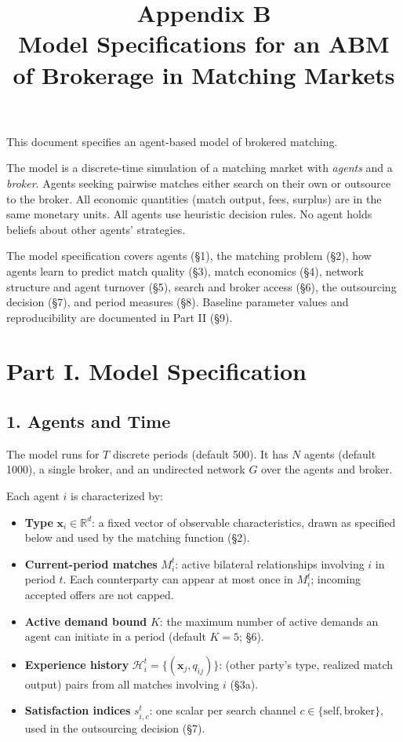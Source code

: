 \documentclass[11pt]{article}
\title{Appendix B\\Model Specifications for an ABM of Brokerage in Matching Markets}
\author{}
\date{}
\providecommand{\tightlist}{%
  \setlength{\itemsep}{0pt}\setlength{\parskip}{0pt}}
\begin{document}
\maketitle

This document specifies an agent-based model of brokered matching.

The model is a discrete-time simulation of a matching market with \emph{agents} and a \emph{broker}. Agents seeking pairwise matches either search on their own or outsource to the broker. All economic quantities (match output, fees, surplus) are in the same monetary units. All agents use heuristic decision rules. No agent holds beliefs about other agents' strategies.

The model specification covers agents (§1), the matching problem (§2), how agents learn to predict match quality (§3), match economics (§4), network structure and agent turnover (§5), search and broker access (§6), the outsourcing decision (§7), and period measures (§8). Baseline parameter values and reproducibility are documented in Part II (§9).

\section{Part I. Model Specification}\label{part-i.-model-specification}

\subsection{1. Agents and Time}\label{agents-and-time}

The model runs for \(T\) discrete periods (default 500). It has \(N\) agents (default 1000), a single broker, and an undirected network \(G\) over the agents and broker.

Each agent \(i\) is characterized by:

\begin{itemize}
\tightlist
\item \textbf{Type} \(\mathbf{x}_i \in \mathbb{R}^d\): a fixed vector of observable characteristics, drawn as specified below and used by the matching function (§2).
\item \textbf{Current-period matches} \(M_i^t\): active bilateral relationships involving \(i\) in period \(t\). Each counterparty can appear at most once in \(M_i^t\); incoming accepted offers are not capped.
\item \textbf{Active demand bound} \(K\): the maximum number of active demands an agent can initiate in a period (default \(K = 5\); §6).
\item \textbf{Experience history} \(\mathcal{H}_{i}^t = \{(\mathbf{x}_j, q_{ij})\}\): (other party's type, realized match output) pairs from all matches involving \(i\) (§3a).
\item \textbf{Satisfaction indices} \(s_{i,c}^t\): one scalar per search channel \(c \in \{\text{self}, \text{broker}\}\), used in the outsourcing decision (§7).
\end{itemize}
\end{document}
